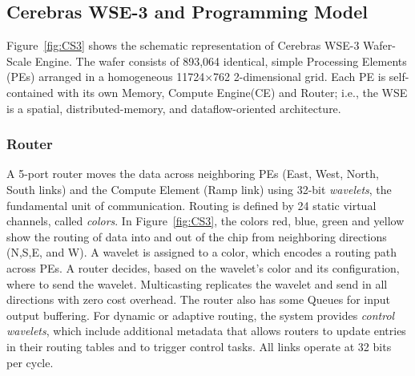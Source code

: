 \documentclass[sigconf]{acmart}
\begin{document}
\subsection{Cerebras WSE-3 and Programming Model}
Figure~\ref{fig:CS3} shows the schematic representation of Cerebras WSE-3 Wafer-Scale Engine. 
The wafer  consists of  893{,}064 identical, simple Processing Elements (PEs) arranged in a homogeneous 11724$\times$762 2-dimensional grid. Each PE is self-contained with its own Memory, Compute Engine(CE) and Router; i.e.,  the WSE is a spatial, distributed-memory, and dataflow-oriented architecture. %

\subsubsection{Router}
A 5-port router moves the data across neighboring PEs (East, West, North, South links) and the Compute Element (Ramp link) using 32-bit \textit{wavelets}, the fundamental unit of communication. Routing is defined by 24 static virtual channels, called \textit{colors}.  In Figure~\ref{fig:CS3}, the colors red, blue, green and yellow show the routing of data into and out of the chip from neighboring directions (N,S,E, and W). %
A wavelet is assigned to a color, which encodes a routing path across PEs. A router decides, based on the wavelet's color and its configuration, where to send the wavelet.
Multicasting replicates the wavelet and send in all directions with zero cost overhead. The router also has some Queues for input output buffering. 
For dynamic or adaptive routing, the system provides \textit{control wavelets}, which include additional metadata that allows routers to update entries in their routing tables and to trigger control tasks. %
All links operate at 32 bits per cycle.
\end{document}
